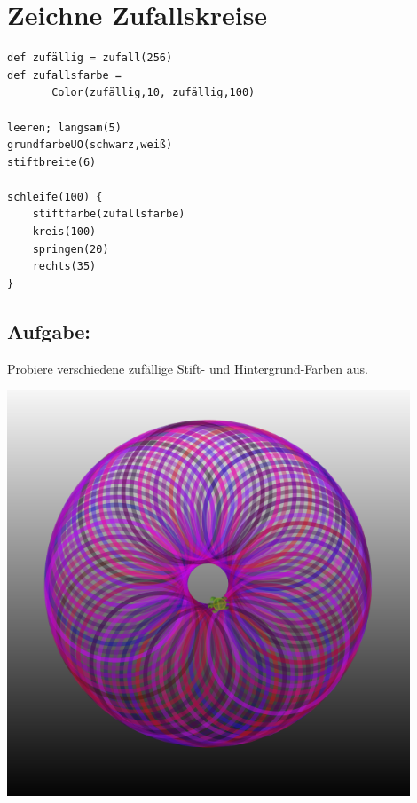 \chapter{Zeichne Zufallskreise}
\begin{multicols}{2}

\begin{lstlisting}[basicstyle={\ttfamily\fontsize{16}{19}\selectfont},numbers=none]
def zufällig = zufall(256)
def zufallsfarbe = 
       Color(zufällig,10, zufällig,100) 

leeren; langsam(5)
grundfarbeUO(schwarz,weiß)
stiftbreite(6)

schleife(100) {
    stiftfarbe(zufallsfarbe)
    kreis(100)
    springen(20)
    rechts(35)
}
\end{lstlisting}
        
\section*{\color{BrickRed}Aufgabe:}
Probiere verschiedene zufällige Stift- und Hintergrund-Farben aus.


\columnbreak


\begin{center}
\includegraphics[width=12.0cm]{../img/circle-of-circles.png}
\end{center}

\end{multicols}

